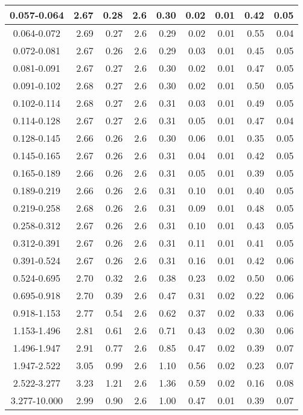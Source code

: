 \begin{table}
\begin{center}
\begin{tabular}{ | c | r | r | r | r | r | r | r | r |}
0.057-0.064 & 2.67 & 0.28 & 2.6 &0.30 & 0.02 & 0.01 & 0.42 & 0.05  \\ \hline
0.064-0.072 & 2.69 & 0.27 & 2.6 &0.29 & 0.02 & 0.01 & 0.55 & 0.04  \\ \hline
0.072-0.081 & 2.67 & 0.26 & 2.6 &0.29 & 0.03 & 0.01 & 0.45 & 0.05  \\ \hline
0.081-0.091 & 2.67 & 0.27 & 2.6 &0.30 & 0.02 & 0.01 & 0.47 & 0.05  \\ \hline
0.091-0.102 & 2.68 & 0.27 & 2.6 &0.30 & 0.02 & 0.01 & 0.50 & 0.05  \\ \hline
0.102-0.114 & 2.68 & 0.27 & 2.6 &0.31 & 0.03 & 0.01 & 0.49 & 0.05  \\ \hline
0.114-0.128 & 2.67 & 0.27 & 2.6 &0.31 & 0.05 & 0.01 & 0.47 & 0.04  \\ \hline
0.128-0.145 & 2.66 & 0.26 & 2.6 &0.30 & 0.06 & 0.01 & 0.35 & 0.05  \\ \hline
0.145-0.165 & 2.67 & 0.26 & 2.6 &0.31 & 0.04 & 0.01 & 0.42 & 0.05  \\ \hline
0.165-0.189 & 2.66 & 0.26 & 2.6 &0.31 & 0.05 & 0.01 & 0.39 & 0.05  \\ \hline
0.189-0.219 & 2.66 & 0.26 & 2.6 &0.31 & 0.10 & 0.01 & 0.40 & 0.05  \\ \hline
0.219-0.258 & 2.68 & 0.26 & 2.6 &0.31 & 0.09 & 0.01 & 0.48 & 0.05  \\ \hline
0.258-0.312 & 2.67 & 0.26 & 2.6 &0.31 & 0.10 & 0.01 & 0.43 & 0.05  \\ \hline
0.312-0.391 & 2.67 & 0.26 & 2.6 &0.31 & 0.11 & 0.01 & 0.41 & 0.05  \\ \hline
0.391-0.524 & 2.67 & 0.26 & 2.6 &0.31 & 0.16 & 0.01 & 0.42 & 0.06  \\ \hline
0.524-0.695 & 2.70 & 0.32 & 2.6 &0.38 & 0.23 & 0.02 & 0.50 & 0.06  \\ \hline
0.695-0.918 & 2.70 & 0.39 & 2.6 &0.47 & 0.31 & 0.02 & 0.22 & 0.06  \\ \hline
0.918-1.153 & 2.77 & 0.54 & 2.6 &0.62 & 0.37 & 0.02 & 0.33 & 0.06  \\ \hline
1.153-1.496 & 2.81 & 0.61 & 2.6 &0.71 & 0.43 & 0.02 & 0.30 & 0.06  \\ \hline
1.496-1.947 & 2.91 & 0.77 & 2.6 &0.85 & 0.47 & 0.02 & 0.39 & 0.07  \\ \hline
1.947-2.522 & 3.05 & 0.99 & 2.6 &1.10 & 0.56 & 0.02 & 0.23 & 0.07  \\ \hline
2.522-3.277 & 3.23 & 1.21 & 2.6 &1.36 & 0.59 & 0.02 & 0.16 & 0.08  \\ \hline
3.277-10.000 & 2.99 & 0.90 & 2.6 &1.00 & 0.47 & 0.01 & 0.39 & 0.07  \\ 
\hline
\hline
\end{tabular}
\end{center}
\end{table}

